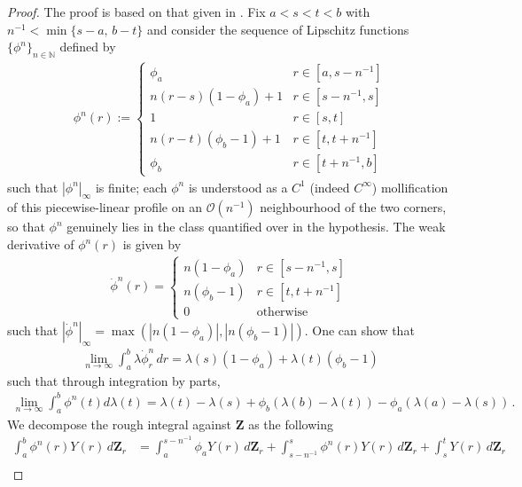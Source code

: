 \documentclass[11pt, oneside]{article}
\numberwithin{equation}{section}
\theoremstyle{definition}
\newcommand{\mc}[1]{\mathcal{#1}}
\newcommand{\mcal}[1]{\mc{#1}}
\begin{document}
\begin{proof}
    The proof is based on that given in \cite[Lemma B.4]{CHLN2022}. Fix $a < s < t < b$ with $n^{-1} < \min\{s-a,\, b-t\}$ and consider the sequence of Lipschitz functions $\{\phi^n\}_{n \in \mathbb{N}}$ defined by
    \begin{align*}
        \phi^n(r) := \begin{cases}
            \phi_a & r \in [a,s-n^{-1}]\\
            n(r-s)(1-\phi_a) + 1 & r \in [s-n^{-1}, s] \\
            1 & r \in [s, t] \\
            n(r-t)(\phi_b-1) + 1 &r \in [t, t + n^{-1}] \\
            \phi_b & r \in [t+n^{-1}, b]
        \end{cases}
    \end{align*}
    such that $|\phi^n|_{\infty}$ is finite; each $\phi^n$ is understood as a $C^1$ (indeed $C^\infty$) mollification of this piecewise-linear profile on an $\mcal{O}(n^{-1})$ neighbourhood of the two corners, so that $\phi^n$ genuinely lies in the class quantified over in the hypothesis. The weak derivative of $\phi^n(r)$ is given by
    \begin{align*}
        \dot{\phi}^n(r) =  \begin{cases}
            n(1-\phi_a) & r \in [s-n^{-1}, s] \\
            n(\phi_b-1) &r \in [t, t + n^{-1}] \\
            0 & \text{otherwise}
        \end{cases}
    \end{align*}
    such that $|\dot{\phi}^n|_\infty = \max(|n(1-\phi_a)|, |n(\phi_b-1)|)$. One can show that 
    \begin{align*}
        \lim_{n \rightarrow \infty}\int_a^b \lambda \dot{\phi}^n_r \,dr = \lambda(s)(1-\phi_a) + \lambda(t)(\phi_b - 1)
    \end{align*}
    such that through integration by parts,
    \begin{align}
        \lim_{n \rightarrow \infty}\int_a^b \phi^n(t)d \lambda(t) = \lambda(t) - \lambda(s) + \phi_b(\lambda(b) - \lambda(t)) - \phi_a(\lambda(a)- \lambda(s))\,.
    \end{align}
    We decompose the rough integral against $\mathbf{Z}$ as the following
    \begin{align*}
        \int_a^b \phi^n(r) Y(r)\,d\mathbf{Z}_r &= \int_a^{s-n^{-1}}\phi_aY(r)\,d\mathbf{Z}_r + \int_{s - n^{-1}}^s \phi^n(r) Y(r)\,d\mathbf{Z}_r + \int_s^t Y(r)\,d\mathbf{Z}_r \\

\end{align*}
\end{proof}
\end{document}
